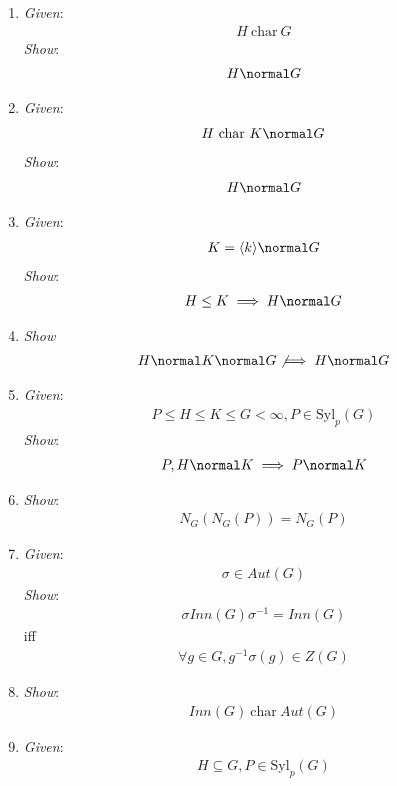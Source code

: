 \begin{enumerate}
\def\labelenumi{\arabic{enumi}.}
\item
  \emph{Given}: \begin{align*}H~\text{char}~G\end{align*} \emph{Show}:
  \begin{align*}H \normal G\end{align*}
\item
  \emph{Given}: \begin{align*}H ~\text{char}~ K \normal G\end{align*}
  \emph{Show}: \begin{align*}H \normal G\end{align*}
\item
  \emph{Given}:
  \begin{align*}K = \langle k \rangle \normal G\end{align*} \emph{Show}:
  \begin{align*}H \leq K \implies H \normal G\end{align*}
\item
  \emph{Show}
  \begin{align*}H \normal K \normal G \not\implies H \normal G\end{align*}
\item
  \emph{Given}:
  \begin{align*}P \leq H \leq K \leq G < \infty, P \in \text{Syl}_p(G)\end{align*}
  \emph{Show}:
  \begin{align*}P, H \normal K \implies P \normal K\end{align*}
\item
  \emph{Show}: \begin{align*}N_G(N_G(P)) = N_G(P)\end{align*}
\item
  \emph{Given}: \begin{align*}\sigma \in Aut(G)\end{align*} \emph{Show}:
  \begin{align*}\sigma Inn(G) \sigma^{-1} = Inn(G)\end{align*} iff
  \begin{align*}\forall g\in G, g^{-1}\sigma(g)\in Z(G)\end{align*}
\item
  \emph{Show}: \begin{align*}Inn(G) ~\text{char}~ Aut(G)\end{align*}
\item
  \emph{Given}:
  \begin{align*}H \subseteq G, P \in \text{Syl}_p(G)\end{align*}


\end{enumerate}
